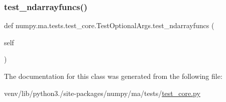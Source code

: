 \subsubsection{\texorpdfstring{test\+\_\+ndarrayfuncs()}{test\_ndarrayfuncs()}}
{\footnotesize\ttfamily def numpy.\+ma.\+tests.\+test\+\_\+core.\+Test\+Optional\+Args.\+test\+\_\+ndarrayfuncs (\begin{DoxyParamCaption}\item[{}]{self }\end{DoxyParamCaption})}



The documentation for this class was generated from the following file\+:\begin{DoxyCompactItemize}
\item 
venv/lib/python3./site-\/packages/numpy/ma/tests/\hyperlink{numpy_2ma_2tests_2test__core_8py}{test\+\_\+core.\+py}\end{DoxyCompactItemize}
